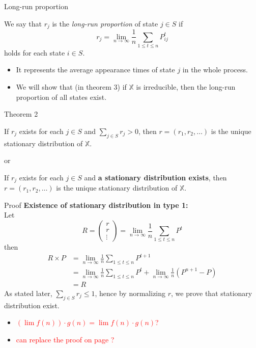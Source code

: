 \documentclass[mathserif]{beamer}
\begin{document}
\begin{frame}{Long-run proportion}
	\begin{definition}
		We say that $r_j$ is the \textit{long-run proportion} of state $j \in S$ if
		\[
		r_j = \lim_{n\to\infty} \frac{1}{n} \sum_{1 \leq t \leq n} P^t_{ij}
		\]
		holds for each state $i \in S$.
	\end{definition}
	\begin{itemize}
		\item It represents the average appearance times of state $j$ in the whole process.
		\item We will show that (in theorem 3) if $\mathbb{X}$ is irreducible, then the long-run proportion of all states exist.
	\end{itemize}
\end{frame}

\begin{frame}{Theorem 2}
	\begin{theorem}[type 1]
	If $r_j$ exists for each $j \in S$ and $\sum_{j \in S} r_j > 0$,
	then $r = (r_1, r_2, \ldots)$ is the unique stationary distribution of $\mathbb{X}$.
	\end{theorem}
	or
	\begin{theorem}[type 2]
	If $r_j$ exists for each $j \in S$ and \textbf{a stationary distribution exists},
	then $r = (r_1, r_2, \ldots)$ is the unique stationary distribution of $\mathbb{X}$.
	\end{theorem}
\end{frame}

\begin{frame}[shrink]{Proof}
	\textbf{Existence of stationary distribution in type 1:} \\
	Let 
	\[
	R = 
	\begin{pmatrix}
		r \\
		r \\
		\vdots
	\end{pmatrix} 
	= \lim_{n\to\infty} \frac{1}{n} \sum_{1 \leq t \leq n} P^t
	\]
	then
	\begin{align*}
		R \times P &= \lim_{n\to\infty} \frac{1}{n} \sum_{1 \leq t \leq n} P^{t+1} \\
		&= \lim_{n\to\infty} \frac{1}{n} \sum_{1 \leq t \leq n} P^t + \lim_{n\to\infty} \frac{1}{n}(P^{n+1} - P) \\
		&= R
	\end{align*}
	As stated later, $\sum_{j \in S} r_j \leq 1$, hence by normalizing $r$, we prove that stationary distribution exist.
	\begin{itemize}
	\item \textcolor{red}{$(\lim f(n))\cdot g(n) = \lim f(n) \cdot g(n)$?}
	\item \textcolor{red}{can replace the proof on page \pageref{existence}?}
	\end{itemize}
\end{frame}
\end{document}
